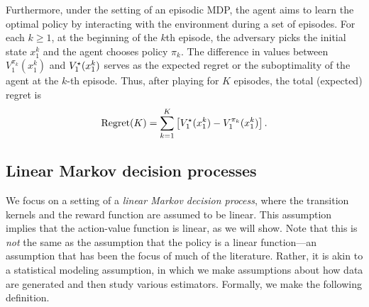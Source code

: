 Furthermore, under the setting of an episodic MDP, the agent aims to learn the optimal policy by interacting with the environment during a set of episodes. For each $k \geq 1$, at the beginning of the $k$th episode, the 
adversary picks the initial  state $x^k_1$ and  the agent chooses  policy $\pi_k$. 
The difference in values between $V^{\pi_k}_1 (x_1^k)$ and ${V}^{\star}_{1} ({x}^{k}_{1}) $ serves as the expected regret or the suboptimality of  the agent at the $k$-th episode. 
Thus, after playing for $K$ episodes, 
the total (expected) regret is 
\begin{equation*}
\text{Regret}(K) = \sum_{k=1}^K \left[{V}^{\star}_{1} ({x}^{k}_{1}) - {V}^{\pi_k}_{1} ({x}^{k}_{1})\right].
\end{equation*}
 


\subsection{Linear Markov decision processes}

We focus on a setting of a \emph{linear Markov decision process}, where the transition kernels and the reward function are assumed to be linear.  This assumption implies that the action-value function is linear, as we will show.  Note that this is \emph{not} the same as the assumption that the policy is a linear function---an assumption that has been the focus of much of the literature. Rather, it is akin to a statistical modeling assumption, in which we make assumptions about how data are generated and then study various estimators.  Formally, we make the following definition.


